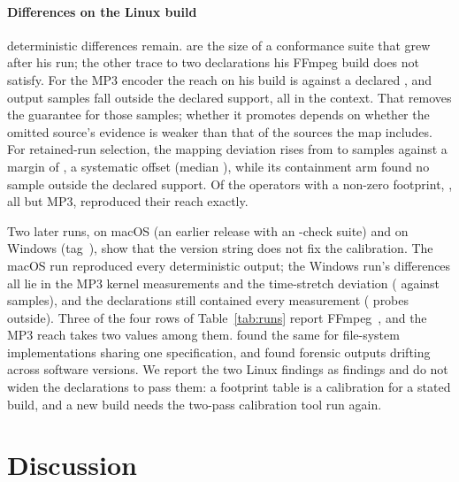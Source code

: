 \documentclass[preprint,3p,11pt,authoryear]{elsarticle}
\begin{document}
\paragraph{Differences on the Linux build} \IRdet{} deterministic differences remain.
\IRdetSuite{} are the size of a conformance suite that grew after his run; the
other \IRdetBuild{} trace to two declarations his FFmpeg build does not satisfy.
For the MP3 encoder the reach on his build is \IRmpReach{} against a declared
\IRmpDeclared{}, and \IRmpOutside{} output samples fall outside the declared
support, all in the \IRmpContext{} context. That removes the guarantee for those
samples; whether it promotes depends on whether the omitted source's evidence is
weaker than that of the sources the map includes. For retained-run selection,
the mapping deviation rises from \IRsilDevRef{} to \IRsilDev{} samples against a
margin of \IRsilGuard{}, a systematic offset (median \IRsilMedian{}), while its
containment arm found no sample outside the declared support. Of the
\IRopsNonzero{} operators with a non-zero footprint, \IRopsAgree{}, all but MP3,
reproduced their reach exactly.

Two later runs, on macOS (an earlier release with an \XBMacChecks{}-check suite)
and on Windows (tag~\XBWinTag{}), show that the version string does not fix the
calibration. The macOS run reproduced every deterministic output; the Windows
run's \XBWinDetDiffs{} differences all lie in the MP3 kernel measurements and the
time-stretch deviation (\XBWinStretchDev{} against \XBRefStretchDev{} samples), and
the declarations still contained every measurement (\XBWinOutside{} probes
outside). Three of the four rows of
Table~\ref{tab:runs} report FFmpeg~\XBMacFfmpeg{}, and the MP3 reach takes two
values among them. \citet{nordvik2022exfat} found the same for file-system
implementations sharing one specification, and \citet{kuelper2026testdriven}
found forensic outputs drifting across software versions. We report the two
Linux findings as findings and do not widen the declarations to pass them: a
footprint table is a calibration for a stated build, and a new build needs the
two-pass calibration tool run again.

\section{Discussion}
\label{sec:discussion}
\end{document}
